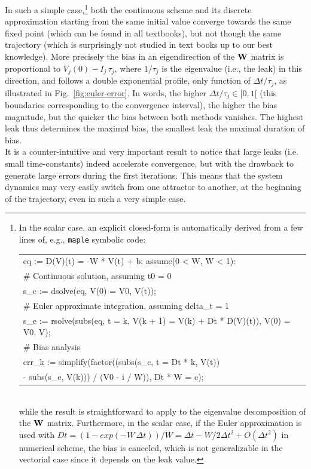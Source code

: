 In such a simple case,\footnote{In the scalar case, an explicit closed-form is automatically derived from a few lines of, e.g., {\tt maple} symbolic code:
\\{\tiny \tt \begin{tabular}{l}
eq := D(V)(t) = -W * V(t) + b: assume(0 < W, W < 1): \\
\# Continuous solution, assuming t0 = 0 \\
s\_c := dsolve({eq, V(0) = V0}, V(t)); \\
\# Euler approximate integration, assuming delta\_t = 1 \\
s\_e := rsolve({subs(eq, t = k, V(k + 1) = V(k) + Dt * D(V)(t)), V(0) = V0}, {V}); \\
\# Bias analysis \\
err\_k := simplify(factor((subs(s\_c, t = Dt * k, V(t)) \\
- subs(s\_e, V(k))) / (V0 - i / W)), {Dt * W = c}); \\
\end{tabular}}\\ while the result is straightforward to apply to the eigenvalue decomposition of the ${\bf W}$ matrix.
Furthermore, in the scalar case, 
if the Euler approximation is used with $Dt = (1 - exp(-W \, \Delta t)) / W = \Delta t - W/2 \Delta t^2 + O(\Delta t^2 )$ in numerical scheme,
the bias is canceled, which is not generalizable in the vectorial case since it depends on the leak value.
}
both the continuous scheme and its discrete approximation starting from the same initial value converge towards the same fixed point (which can be found in all textbooks), but not though the same trajectory (which is surprisingly not studied in text books up to our best knowledge).  More precisely the bias in an eigendirection of the ${\bf W}$ matrix is proportional to $V_j(0) - I_j \, \tau_j$, where $1/\tau_j$ is the eigenvalue (i.e., the leak) in this direction, and follows a double exponential profile, only function of $\Delta t / \tau_j$, as illustrated in Fig.~\ref{fig:euler-error}. In words, the higher $\Delta t / \tau_j \in [0, 1[$ (this boundaries corresponding to the convergence interval), the higher the bias magnitude, but the quicker the bias between both methods vanishes.  The highest leak thus determines the maximal bias, the smallest leak the maximal duration of bias. \\

It is a counter-intuitive and very important result to notice that large leaks (i.e. small time-constants) indeed accelerate convergence, but with the drawback to generate large errors during the first iterations.  This means that the system dynamics may very easily switch from one attractor to another, at the beginning of the trajectory, even in such a very simple case.

